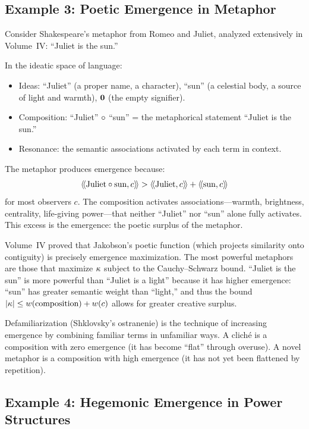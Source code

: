 \subsection{Example 3: Poetic Emergence in Metaphor}

Consider Shakespeare's metaphor from Romeo and Juliet, analyzed extensively in
Volume~IV: ``Juliet is the sun.''

In the ideatic space of language:
\begin{itemize}
  \item Ideas: ``Juliet'' (a proper name, a character), ``sun'' (a celestial
    body, a source of light and warmth), $\mathbf{0}$ (the empty signifier).
  \item Composition: ``Juliet'' $\circ$ ``sun'' = the metaphorical statement
    ``Juliet is the sun.''
  \item Resonance: the semantic associations activated by each term in context.
\end{itemize}

The metaphor produces emergence because:
\[
  \langle\!\langle \text{Juliet} \circ \text{sun}, c \rangle\!\rangle
    > \langle\!\langle \text{Juliet}, c \rangle\!\rangle + \langle\!\langle \text{sun}, c \rangle\!\rangle
\]
for most observers $c$. The composition activates associations---warmth,
brightness, centrality, life-giving power---that neither ``Juliet'' nor
``sun'' alone fully activates. This excess is the emergence: the poetic
surplus of the metaphor.

Volume~IV proved that Jakobson's poetic function (which projects similarity
onto contiguity) is precisely emergence maximization. The most powerful
metaphors are those that maximize $\kappa$ subject to the Cauchy--Schwarz
bound. ``Juliet is the sun'' is more powerful than ``Juliet is a light''
because it has higher emergence: ``sun'' has greater semantic weight than
``light,'' and thus the bound $|\kappa| \leq w(\text{composition}) +
w(c)$ allows for greater creative surplus.

Defamiliarization (Shklovsky's ostranenie) is the technique of increasing
emergence by combining familiar terms in unfamiliar ways. A cliché is a
composition with zero emergence (it has become ``flat'' through overuse). A
novel metaphor is a composition with high emergence (it has not yet been
flattened by repetition).

\subsection{Example 4: Hegemonic Emergence in Power Structures}

